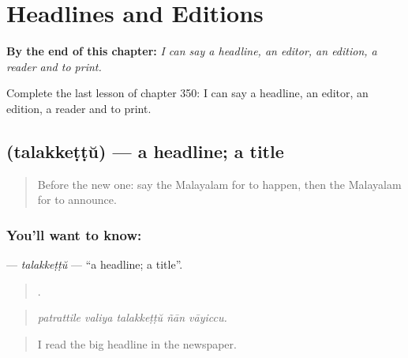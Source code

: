 
\chapter{Headlines and Editions}
\label{ch:ml-headlines-and-editions}

\begin{chapteropening}
\textbf{By the end of this chapter:} \emph{I can say a headline, an editor, an edition, a reader and to print.}

Complete the last lesson of chapter 350: I can say a headline, an editor, an edition, a reader and to print.
\end{chapteropening}

\section[\texorpdfstring{\ml{തലക്കെട്ട്} (talakkeṭṭŭ)}{തലക്കെട്ട് (talakkeṭṭŭ)}]{ (talakkeṭṭŭ) — a headline; a title}

\label{lesson:ML-C350-talakkettu}



\begin{quote}
Before the new one: say the Malayalam for to happen, then the Malayalam for to announce.
\end{quote}

\subsection*{You'll want to know: }
\textbf{} — \emph{talakkeṭṭŭ} — \textquotedblleft{}a headline; a title\textquotedblright{}.

\begin{quote}
    .
\end{quote}

\begin{quote}
\emph{patrattile valiya talakkeṭṭŭ ñān vāyiccu.}
\end{quote}

\begin{quote}
I read the big headline in the newspaper.
\end{quote}

